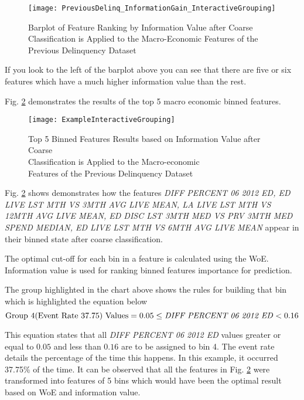 \begin{figure}[H]
	\texttt{[image: PreviousDelinq\_InformationGain\_InteractiveGrouping]}
	\caption{Barplot of Feature Ranking by Information Value after Coarse \\ Classification is Applied to the Macro-Economic Features of the Previous Delinquency Dataset}
	\label{fig:Information Value using SAS Previous Delinquency Features}
\end{figure}

If you look to the left of the barplot above you can see that there are five or six features which have a much higher information value than the rest.


Fig. \ref{fig:Interactive Grouping Diff Percent 06 2012 ED} demonstrates the results of the top 5 macro economic binned features.
\begin{figure}[H]
	\texttt{[image: ExampleInteractiveGrouping]}
	\caption{Top 5 Binned Features Results based on Information Value after Coarse \\Classification is Applied to the Macro-economic\\ Features of the Previous Delinquency Dataset}
	\label{fig:Interactive Grouping Diff Percent 06 2012 ED}
\end{figure}

Fig. \ref{fig:Interactive Grouping Diff Percent 06 2012 ED} shows demonstrates how the features  \textit{DIFF PERCENT 06 2012 ED, ED LIVE LST MTH VS 3MTH AVG LIVE MEAN, LA LIVE LST MTH VS 12MTH AVG LIVE MEAN, ED DISC LST 3MTH MED VS PRV 3MTH MED SPEND MEDIAN, ED LIVE LST MTH VS 6MTH AVG LIVE MEAN} appear in their binned state after coarse classification. 

The optimal cut-off for each bin in a feature is calculated using the WoE. Information value is used for ranking binned features importance for prediction. 

The group highlighted in the chart above shows the rules for building that bin which is highlighted the equation below
\[
\text{Group 4(Event Rate 37.75) Values} = 0.05 \leq \text{\textit{DIFF PERCENT 06 2012 ED}} < 0.16
\]

This equation states that all \textit{DIFF PERCENT 06 2012 ED} values greater or equal to $0.05$ and less than $0.16$ are to be assigned to bin 4. The event rate details the percentage of the time this happens. In this example, it occurred 37.75\% of the time. It can be observed that all the features in Fig. \ref{fig:Interactive Grouping Diff Percent 06 2012 ED} were transformed into features of 5 bins which would have been the optimal result based on WoE and information value.

